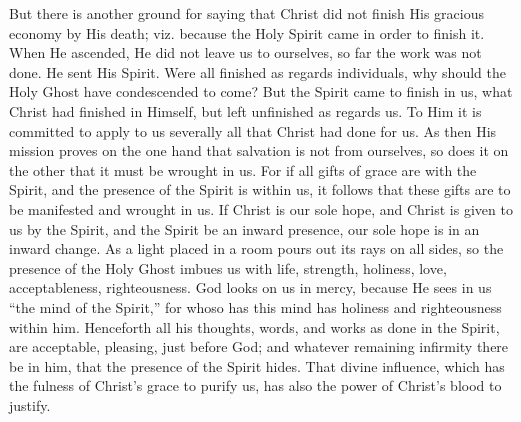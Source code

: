 But there is another ground for saying that Christ did not finish
His gracious economy by His death; viz. because the Holy Spirit came
in order to finish it. When He ascended, He did not leave us to
ourselves, so far the work was not done. He sent His Spirit. Were all
finished as regards individuals, why should the Holy Ghost have
condescended to come? But the Spirit came to finish in us, what Christ
had finished in Himself, but left unfinished as regards us. To Him it
is committed to apply to us severally all that Christ had done for us.
As then His mission proves on the one hand that salvation is not from
ourselves, so does it on the other that it must be wrought in us. For
if all gifts of grace are with the Spirit, and the presence of the
Spirit is within us, it follows that these gifts are to be manifested
and wrought in us. If Christ is our sole hope, and Christ is given to
us by the Spirit, and the Spirit be an inward presence, our sole hope
is in an inward change. As a light placed in a room pours out its rays
on all sides, so the presence of the Holy Ghost imbues us with life,
strength, holiness, love, acceptableness, righteousness. God looks on
us in mercy, because He sees in us ``the mind of the Spirit,''
for whoso has this mind has holiness and righteousness within him.
Henceforth all his thoughts, words, and works as done in the Spirit,
are acceptable, pleasing, just before God; and whatever remaining
infirmity there be in him, that the presence of the Spirit hides. That
divine influence, which has the fulness of Christ's grace to purify
us, has also the power of Christ's blood to justify.

